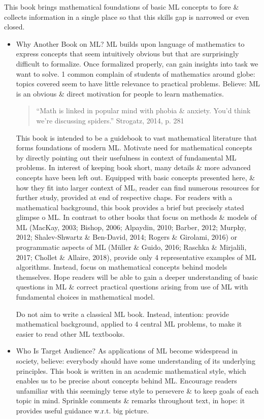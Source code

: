 \documentclass{article}
\begin{document}
\begin{enumerate}
	This book brings mathematical foundations of basic ML concepts to fore \& collects information in a single place so that this skills gap is narrowed or even closed.
	\begin{itemize}
		\item {\sf Why Another Book on ML?} ML builds upon language of mathematics to express concepts that seem intuitively obvious but that are surprisingly difficult to formalize. Once formalized properly, can gain insights into task we want to solve. 1 common complain of students of mathematics around globe: topics covered seem to have little relevance to practical problems. Believe: ML is an obvious \& direct motivation for people to learn mathematics.
		\begin{quote}
			``Math is linked in popular mind with phobia \& anxiety. You'd think we're discussing spiders.'' Strogatz, 2014, p. 281
		\end{quote}
		This book is intended to be a guidebook to vast mathematical literature that forms foundations of modern ML. Motivate need for mathematical concepts by directly pointing out their usefulness in context of fundamental ML problems. In interest of keeping book short, many details \& more advanced concepts have been left out. Equipped with basic concepts presented here, \& how they fit into larger context of ML, reader can find numerous resources for further study, provided at end of respective chaps. For readers with a mathematical background, this book provides a brief but precisely stated glimpse o ML. In contrast to other books that focus on methods \& models of ML (MacKay, 2003; Bishop, 2006; Alpaydin, 2010; Barber, 2012; Murphy, 2012; Shalev-Shwartz \& Ben-David, 2014; Rogers \& Girolami, 2016) or programmatic aspects of ML (Müller \& Guido, 2016; Raschka \& Mirjalili, 2017; Chollet \& Allaire, 2018), provide only 4 representative examples of ML algorithms. Instead, focus on mathematical concepts behind models themselves. Hope readers will be able to gain a deeper understanding of basic questions in ML \& correct practical questions arising from use of ML with fundamental choices in mathematical model.
		
		Do not aim to write a classical ML book. Instead, intention: provide mathematical background, applied to 4 central ML problems, to make it easier to read other ML textbooks.
		\item {\sf Who Is Target Audience?} As applications of ML become widespread in society, believe: everybody should have some understanding of its underlying principles. This book is written in an academic mathematical style, which enables us to be precise about concepts behind ML. Encourage readers unfamiliar with this seemingly terse style to persevere \& to keep goals of each topic in mind. Sprinkle comments \& remarks throughout text, in hope: it provides useful guidance w.r.t. big picture.
		

\end{itemize}
\end{enumerate}
\end{document}
